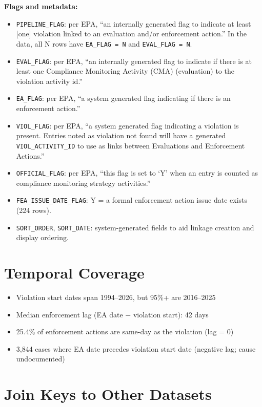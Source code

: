 \documentclass[11pt]{article}
\begin{document}
\textbf{Flags and metadata:}
\begin{itemize}[nosep]
  \item \texttt{PIPELINE\_FLAG}: per EPA, ``an internally generated flag to indicate at least [one] violation linked to an evaluation and/or enforcement action.'' In the data, all N rows have \texttt{EA\_FLAG = N} and \texttt{EVAL\_FLAG = N}.
  \item \texttt{EVAL\_FLAG}: per EPA, ``an internally generated flag to indicate if there is at least one Compliance Monitoring Activity (CMA) (evaluation) to the violation activity id.''
  \item \texttt{EA\_FLAG}: per EPA, ``a system generated flag indicating if there is an enforcement action.''
  \item \texttt{VIOL\_FLAG}: per EPA, ``a system generated flag indicating a violation is present. Entries noted as violation not found will have a generated \texttt{VIOL\_ACTIVITY\_ID} to use as links between Evaluations and Enforcement Actions.''
  \item \texttt{OFFICIAL\_FLAG}: per EPA, ``this flag is set to `Y' when an entry is counted as compliance monitoring strategy activities.''
  \item \texttt{FEA\_ISSUE\_DATE\_FLAG}: Y = a formal enforcement action issue date exists (224 rows).
  \item \texttt{SORT\_ORDER}, \texttt{SORT\_DATE}: system-generated fields to aid linkage creation and display ordering.
\end{itemize}

\section{Temporal Coverage}

\begin{itemize}[nosep]
  \item Violation start dates span 1994--2026, but 95\%+ are 2016--2025
  \item Median enforcement lag (EA date $-$ violation start): 42 days
  \item 25.4\% of enforcement actions are same-day as the violation (lag = 0)
  \item 3,844 cases where EA date precedes violation start date (negative lag; cause undocumented)
\end{itemize}

\section{Join Keys to Other Datasets}
\end{document}
